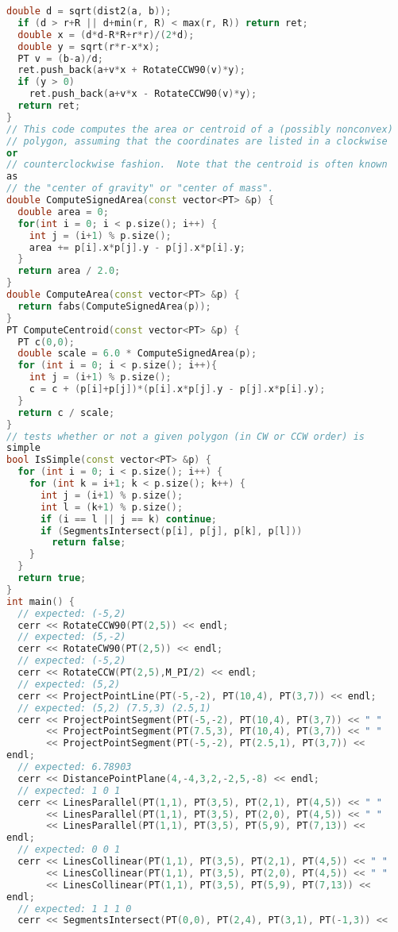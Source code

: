 \begin{lstlisting}[language=C++]
  double d = sqrt(dist2(a, b));
  if (d > r+R || d+min(r, R) < max(r, R)) return ret;
  double x = (d*d-R*R+r*r)/(2*d);
  double y = sqrt(r*r-x*x);
  PT v = (b-a)/d;
  ret.push_back(a+v*x + RotateCCW90(v)*y);
  if (y > 0)
    ret.push_back(a+v*x - RotateCCW90(v)*y);
  return ret;
}
// This code computes the area or centroid of a (possibly nonconvex)
// polygon, assuming that the coordinates are listed in a clockwise 
or
// counterclockwise fashion.  Note that the centroid is often known 
as
// the "center of gravity" or "center of mass".
double ComputeSignedArea(const vector<PT> &p) {
  double area = 0;
  for(int i = 0; i < p.size(); i++) {
    int j = (i+1) % p.size();
    area += p[i].x*p[j].y - p[j].x*p[i].y;
  }
  return area / 2.0;
}
double ComputeArea(const vector<PT> &p) {
  return fabs(ComputeSignedArea(p));
}
PT ComputeCentroid(const vector<PT> &p) {
  PT c(0,0);
  double scale = 6.0 * ComputeSignedArea(p);
  for (int i = 0; i < p.size(); i++){
    int j = (i+1) % p.size();
    c = c + (p[i]+p[j])*(p[i].x*p[j].y - p[j].x*p[i].y);
  }
  return c / scale;
}
// tests whether or not a given polygon (in CW or CCW order) is 
simple
bool IsSimple(const vector<PT> &p) {
  for (int i = 0; i < p.size(); i++) {
    for (int k = i+1; k < p.size(); k++) {
      int j = (i+1) % p.size();
      int l = (k+1) % p.size();
      if (i == l || j == k) continue;
      if (SegmentsIntersect(p[i], p[j], p[k], p[l])) 
        return false;
    }
  }
  return true;
}
int main() {
  // expected: (-5,2)
  cerr << RotateCCW90(PT(2,5)) << endl;
  // expected: (5,-2)
  cerr << RotateCW90(PT(2,5)) << endl;
  // expected: (-5,2)
  cerr << RotateCCW(PT(2,5),M_PI/2) << endl;
  // expected: (5,2)
  cerr << ProjectPointLine(PT(-5,-2), PT(10,4), PT(3,7)) << endl;
  // expected: (5,2) (7.5,3) (2.5,1)
  cerr << ProjectPointSegment(PT(-5,-2), PT(10,4), PT(3,7)) << " "
       << ProjectPointSegment(PT(7.5,3), PT(10,4), PT(3,7)) << " "
       << ProjectPointSegment(PT(-5,-2), PT(2.5,1), PT(3,7)) << 
endl;
  // expected: 6.78903
  cerr << DistancePointPlane(4,-4,3,2,-2,5,-8) << endl;
  // expected: 1 0 1
  cerr << LinesParallel(PT(1,1), PT(3,5), PT(2,1), PT(4,5)) << " "
       << LinesParallel(PT(1,1), PT(3,5), PT(2,0), PT(4,5)) << " "
       << LinesParallel(PT(1,1), PT(3,5), PT(5,9), PT(7,13)) << 
endl;
  // expected: 0 0 1
  cerr << LinesCollinear(PT(1,1), PT(3,5), PT(2,1), PT(4,5)) << " "
       << LinesCollinear(PT(1,1), PT(3,5), PT(2,0), PT(4,5)) << " "
       << LinesCollinear(PT(1,1), PT(3,5), PT(5,9), PT(7,13)) << 
endl;
  // expected: 1 1 1 0
  cerr << SegmentsIntersect(PT(0,0), PT(2,4), PT(3,1), PT(-1,3)) << 

\end{lstlisting}
